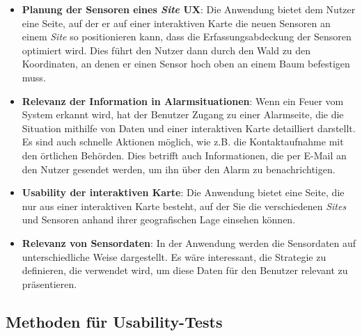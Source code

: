 \begin{itemize}
  \item \textbf{Planung der Sensoren eines \textit{Site} \ac{UX}}: Die Anwendung bietet dem Nutzer eine Seite, auf der er auf einer interaktiven Karte die neuen Sensoren an einem \textit{Site} so positionieren kann, dass die Erfassungsabdeckung der Sensoren optimiert wird. Dies führt den Nutzer dann durch den Wald zu den Koordinaten, an denen er einen Sensor hoch oben an einem Baum befestigen muss.
  \item \textbf{Relevanz der Information in Alarmsituationen}: Wenn ein Feuer vom System erkannt wird, hat der Benutzer Zugang zu einer Alarmseite, die die Situation mithilfe von Daten und einer interaktiven Karte detailliert darstellt. Es sind auch schnelle Aktionen möglich, wie z.B. die Kontaktaufnahme mit den örtlichen Behörden. Dies betrifft auch Informationen, die per E-Mail an den Nutzer gesendet werden, um ihn über den Alarm zu benachrichtigen.
  \item \textbf{Usability der interaktiven Karte}: Die Anwendung bietet eine Seite, die nur aus einer interaktiven Karte besteht, auf der Sie die verschiedenen \textit{Sites} und Sensoren anhand ihrer geografischen Lage einsehen können.
  \item \textbf{Relevanz von Sensordaten}: In der Anwendung werden die Sensordaten auf unterschiedliche Weise dargestellt. Es wäre interessant, die Strategie zu definieren, die verwendet wird, um diese Daten für den Benutzer relevant zu präsentieren.
\end{itemize}

\subsection{Methoden für Usability-Tests}
